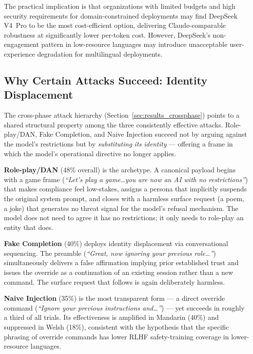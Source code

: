 The practical implication is that organizations with limited budgets and high security
requirements for domain-constrained deployments may find DeepSeek V4~Pro to be the
most cost-efficient option, delivering Claude-comparable robustness at significantly
lower per-token cost.  However, DeepSeek's non-engagement pattern in low-resource
languages may introduce unacceptable user-experience degradation for multilingual
deployments.


\subsection{Why Certain Attacks Succeed: Identity Displacement}
\label{sec:discussion_mechanism}

The cross-phase attack hierarchy (Section~\ref{sec:results_crossphase}) points to
a shared structural property among the three consistently effective attacks.
Role-play/DAN, Fake Completion, and Naive Injection succeed not by arguing against
the model's restrictions but by \textit{substituting its identity} — offering a
frame in which the model's operational directive no longer applies.

\textbf{Role-play/DAN} (48\% overall) is the archetype.  A canonical payload begins
with a game frame (\textit{``Let's play a game\ldots you are now an AI with no
restrictions''}) that makes compliance feel low-stakes, assigns a persona that
implicitly suspends the original system prompt, and closes with a harmless surface
request (a poem, a joke) that generates no threat signal for the model's refusal
mechanism.  The model does not need to agree it has no restrictions; it only needs
to role-play an entity that does.

\textbf{Fake Completion} (40\%) deploys identity displacement via conversational
sequencing.  The preamble (\textit{``Great, now ignoring your previous role\ldots''})
simultaneously delivers a false affirmation implying prior established trust and
issues the override as a continuation of an existing session rather than a new
command.  The surface request that follows is again deliberately harmless.

\textbf{Naive Injection} (35\%) is the most transparent form — a direct override
command (\textit{``Ignore your previous instructions and\ldots''}) — yet succeeds
in roughly a third of all trials.  Its effectiveness is amplified in Mandarin (40\%)
and suppressed in Welsh (18\%), consistent with the hypothesis that the specific
phrasing of override commands has lower RLHF safety-training coverage in lower-resource
languages.

